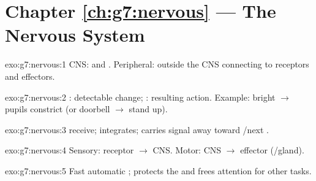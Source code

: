\section*{Chapter \ref{ch:g7:nervous} --- The Nervous System}

\begin{solution}{exo:g7:nervous:1}
CNS:  and . Peripheral:  outside the CNS connecting
to receptors and effectors.
\end{solution}

\begin{solution}{exo:g7:nervous:2}
: detectable change; : resulting action. Example: bright
 $\to$ pupils constrict (or doorbell $\to$ stand up).
\end{solution}

\begin{solution}{exo:g7:nervous:3}
 receive;  integrates;  carries signal away toward
/next .
\end{solution}

\begin{solution}{exo:g7:nervous:4}
Sensory: receptor $\to$ CNS. Motor: CNS $\to$ effector (/gland).
\end{solution}

\begin{solution}{exo:g7:nervous:5}
Fast automatic ; protects the  and frees attention for other
tasks.
\end{solution}

